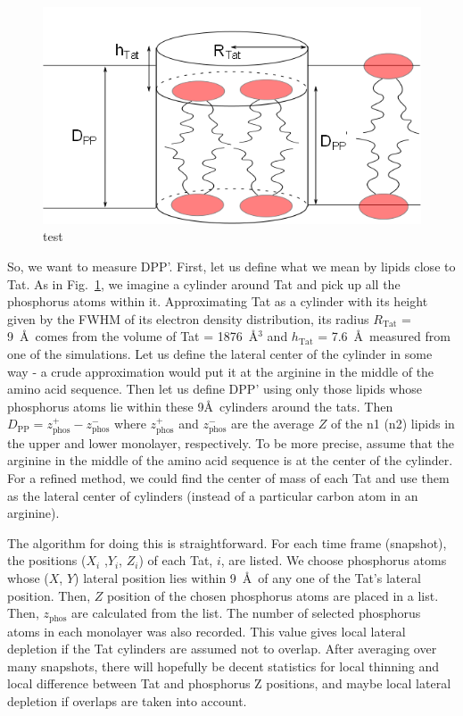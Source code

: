 \documentclass[12pt,letterpaper]{article}
\newcommand{\zphos}{z_\textrm{phos}}
\newcommand{\hTat}{h_\mathrm{Tat}}
\begin{document}
\begin{figure}[htbp]
  \centering
  \includegraphics[scale=0.5]{./figures/cylinder_model}
  \caption{test}
  \label{fig:cylinder_model}
\end{figure}
So, we want to measure DPP'.  First, let us define what we mean by lipids 
close to Tat.  As in Fig.~\ref{fig:cylinder_model}, we imagine a cylinder around Tat and 
pick up all the phosphorus atoms within it.  Approximating Tat as a cylinder 
with its height given by the FWHM of its electron density distribution, its 
radius $R_\mathrm{Tat}$ = 9~\AA\ comes from the volume of Tat = 1876~\AA$^3$ and 
$\hTat$ = 7.6~\AA\
measured from one of the simulations. Let us define the lateral center of the 
cylinder in some way - a crude approximation would put it at the arginine in 
the middle of the amino acid sequence. Then let us define DPP' using only 
those lipids whose phosphorus atoms lie within these 9\AA\ cylinders around the 
tats. Then $D_\mathrm{PP} = \zphos^+ - \zphos^-$ where $\zphos^+$ and $\zphos^-$ 
are the 
average $Z$ of the n1 (n2) lipids in the upper and lower monolayer, respectively.  
To be more precise, assume that the arginine in the middle of the amino acid 
sequence is at the center of the cylinder. For a refined method, we could find 
the center of mass of each Tat and use them as the lateral center of cylinders 
(instead of a particular carbon atom in an arginine). 

The algorithm for doing this is straightforward.  For each time frame 
(snapshot), the positions ($X_i$ ,$Y_i$, $Z_i$) of each Tat, $i$, are listed.   
We choose phosphorus atoms whose ($X$, $Y$) lateral position lies within 
9~\AA\ of any one of the Tat's lateral position. Then, $Z$ position
of the chosen phosphorus atoms are placed in a 
list. Then, $\zphos$ are calculated from the list. 
The number of selected phosphorus atoms in each monolayer was also 
recorded. This value gives local lateral depletion if the Tat cylinders 
are assumed not to overlap. After averaging over many snapshots, 
there will hopefully be decent statistics 
for local thinning and local difference between Tat and phosphorus Z positions, 
and maybe local lateral depletion if overlaps are taken into account.  
\end{document}
